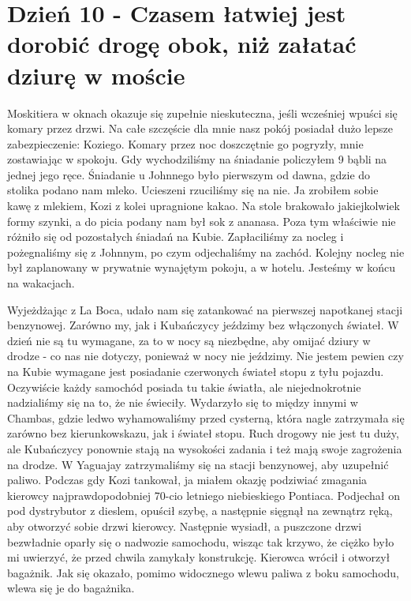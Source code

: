 
\chapter[Czasem łatwiej jest dorobić drogę obok, niż załatać dziurę w moście]{Dzień 10 - Czasem łatwiej jest dorobić drogę obok, niż załatać dziurę w moście}

Moskitiera w oknach okazuje się zupełnie nieskuteczna, jeśli wcześniej wpuści się komary przez drzwi.
Na całe szczęście dla mnie nasz pokój posiadał dużo lepsze zabezpieczenie: Koziego.
Komary przez noc doszczętnie go pogryzły, mnie zostawiając w spokoju.
Gdy wychodziliśmy na śniadanie policzyłem 9 bąbli na jednej jego ręce.
Śniadanie u Johnnego było pierwszym od dawna, gdzie do stolika podano nam mleko.
Ucieszeni rzuciliśmy się na nie.
Ja zrobiłem sobie kawę z mlekiem, Kozi z kolei upragnione kakao.
Na stole brakowało jakiejkolwiek formy szynki, a do picia podany nam był sok z ananasa.
Poza tym właściwie nie różniło się od pozostałych śniadań na Kubie.
Zapłaciliśmy za nocleg i pożegnaliśmy się z Johnnym, po czym odjechaliśmy na zachód.
Kolejny nocleg nie był zaplanowany w prywatnie wynajętym pokoju, a w hotelu.
Jesteśmy w końcu na wakacjach.
\par Wyjeżdżając z La Boca, udało nam się zatankować na pierwszej napotkanej stacji benzynowej.
Zarówno my, jak i Kubańczycy jeździmy bez włączonych świateł.
W dzień nie są tu wymagane, za to w nocy są niezbędne, aby omijać dziury w drodze - co nas nie dotyczy, ponieważ w nocy nie jeździmy.
Nie jestem pewien czy na Kubie wymagane jest posiadanie czerwonych świateł stopu z tyłu pojazdu.
Oczywiście każdy samochód posiada tu takie światła, ale niejednokrotnie nadzialiśmy się na to, że nie świeciły.
Wydarzyło się to między innymi w Chambas, gdzie ledwo wyhamowaliśmy przed cysterną, która nagle zatrzymała się zarówno bez kierunkowskazu, jak i świateł stopu.
Ruch drogowy nie jest tu duży, ale Kubańczycy ponownie stają na wysokości zadania i też mają swoje zagrożenia na drodze.
W Yaguajay zatrzymaliśmy się na stacji benzynowej, aby uzupełnić paliwo.
Podczas gdy Kozi tankował, ja miałem okazję podziwiać zmagania kierowcy najprawdopodobniej 70-cio letniego niebieskiego Pontiaca.
Podjechał on pod dystrybutor z dieslem, opuścił szybę, a następnie sięgnął na zewnątrz ręką, aby otworzyć sobie drzwi kierowcy.
Następnie wysiadł, a puszczone drzwi bezwładnie oparły się o nadwozie samochodu, wisząc tak krzywo, że ciężko było mi uwierzyć, że przed chwila zamykały konstrukcję.
Kierowca wrócił i otworzył bagażnik.
Jak się okazało, pomimo widocznego wlewu paliwa z boku samochodu, wlewa się je do bagażnika.
